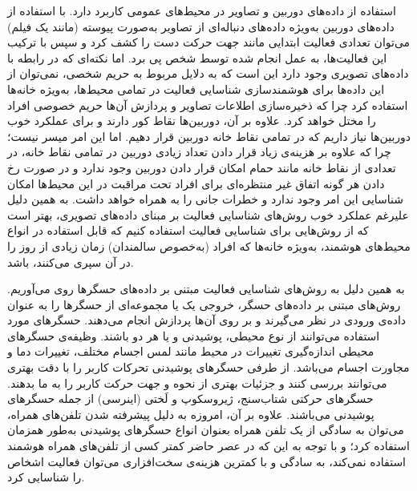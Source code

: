 استفاده از داده‌های دوربین و تصاویر در محیط‌های عمومی کاربرد دارد. با استفاده از داده‌های دوربین به‌ویژه داده‌های دنباله‌ای از تصاویر به‌صورت پیوسته (مانند یک فیلم) می‌توان تعدادی
فعالیت ابتدایی
مانند جهت حرکت دست را کشف کرد و سپس با ترکیب این فعالیت‌ها، به عمل انجام شده توسط شخص پی برد\cite{dhillon2017recent}.
اما نکته‌ای که در رابطه با داده‌های تصویری وجود دارد این است که به دلایل مربوط به حریم شخصی، نمی‌توان از این داده‌ها برای هوشمندسازی شناسایی فعالیت در تمامی محیط‌ها، به‌ویژه خانه‌ها استفاده کرد چرا که ذخیره‌سازی اطلاعات تصاویر و پردازش آن‌ها حریم خصوصی افراد را مختل خواهد کرد. علاوه بر آن، دوربین‌ها نقاط کور دارند و برای عملکرد خوب دوربین‌ها نیاز داریم که در تمامی نقاط خانه دوربین قرار دهیم. اما این امر میسر نیست؛ چرا که علاوه بر هزینه‌ی زیاد قرار دادن تعداد زیادی دوربین در تمامی نقاط خانه، در تعدادی از نقاط خانه مانند حمام امکان قرار دادن دوربین وجود ندارد و در صورت رخ دادن هر گونه اتفاق غیر منتظره‌ای برای افراد تحت مراقبت در این محیط‌ها امکان شناسایی این امر وجود ندارد و خطرات جانی را به همراه خواهد داشت. به همین دلیل علیرغم عملکرد خوب روش‌های شناسایی فعالیت بر مبنای
داده‌های تصویری\cite{mathew2023human}،
بهتر است که از روش‌هایی برای شناسایی فعالیت استفاده کنیم که قابل استفاده در انواع محیط‌های هوشمند، به‌ویژه خانه‌ها که افراد (به‌خصوص سالمندان) زمان زیادی از روز را در آن سپری می‌کنند، باشد.

به همین دلیل به روش‌های شناسایی فعالیت مبتنی بر داده‌های حسگرها روی می‌آوریم. روش‌های مبتنی بر داده‌های حسگر، خروجی یک یا مجموعه‌ای از حسگرها را به عنوان داده‌ی ورودی در نظر می‌گیرند و بر روی آن‌ها پردازش انجام می‌دهند. حسگرهای مورد استفاده می‌توانند از نوع
محیطی\cite{cook2012casas}،
پوشیدنی\cite{vavoulas2016mobiact}
و یا هر دو\cite{roggen2010walk}
باشند. وظیفه‌ی حسگرهای محیطی اندازه‌گیری تغییرات در محیط مانند لمس اجسام مختلف، تغییرات دما و مجاورت اجسام می‌باشد. از طرفی حسگرهای پوشیدنی تحرکات کاربر را با دقت بهتری می‌توانند بررسی کنند و جزئیات بهتری از نحوه و جهت حرکت کاربر را به ما بدهند. حسگرهای حرکتی
شتاب‌سنج،
ژیروسکوپ
و لَختی (اینرسی)
از جمله حسگرهای پوشیدنی می‌باشند. علاوه بر آن، امروزه به دلیل پیشرفته شدن تلفن‌های همراه، می‌توان به سادگی از یک تلفن همراه بعنوان انواع حسگرهای پوشیدنی به‌طور همزمان استفاده کرد\cite{reyes2016transition}؛
و با توجه به این که در عصر حاضر کمتر کسی از تلفن‌های همراه هوشمند استفاده نمی‌کند، به سادگی و با کمترین هزینه‌ی سخت‌افزاری می‌توان فعالیت اشخاص را شناسایی کرد.

